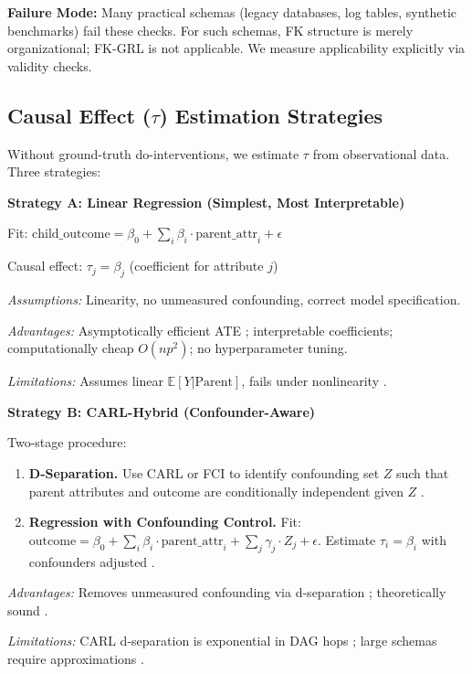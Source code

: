 \documentclass[11pt,letterpaper]{article}
\begin{document}
\textbf{Failure Mode:} Many practical schemas (legacy databases, log tables, synthetic benchmarks) fail these checks. For such schemas, FK structure is merely organizational; FK-GRL is not applicable. We measure applicability explicitly via validity checks.

\subsection{Causal Effect ($\tau$) Estimation Strategies}

Without ground-truth do-interventions, we estimate $\tau$ from observational data. Three strategies:

\textbf{Strategy A: Linear Regression (Simplest, Most Interpretable)}

Fit: $\text{child\_outcome} = \beta_0 + \sum_i \beta_i \cdot \text{parent\_attr}_i + \epsilon$ \cite{Facure2024}

Causal effect: $\tau_j = \beta_j$ (coefficient for attribute $j$) \cite{Facure2024}

\textit{Assumptions:} Linearity, no unmeasured confounding, correct model specification.

\textit{Advantages:} Asymptotically efficient ATE \cite{Facure2024}; interpretable coefficients; computationally cheap $O(np^2)$; no hyperparameter tuning.

\textit{Limitations:} Assumes linear $\mathbb{E}[Y|\text{Parent}]$, fails under nonlinearity \cite{Schoelkopf2020}.

\textbf{Strategy B: CARL-Hybrid (Confounder-Aware)}

Two-stage procedure:

\begin{enumerate}
\item \textbf{D-Separation.} Use CARL \cite{Salimi2020} or FCI to identify confounding set $Z$ such that parent attributes and outcome are conditionally independent given $Z$ \cite{Salimi2020}.
\item \textbf{Regression with Confounding Control.} Fit: $\text{outcome} = \beta_0 + \sum_i \beta_i \cdot \text{parent\_attr}_i + \sum_j \gamma_j \cdot Z_j + \epsilon$. Estimate $\tau_i = \beta_i$ with confounders adjusted \cite{Salimi2020}.
\end{enumerate}

\textit{Advantages:} Removes unmeasured confounding via d-separation \cite{Salimi2020}; theoretically sound \cite{Salimi2020}.

\textit{Limitations:} CARL d-separation is exponential in DAG hops \cite{Negro2025}; large schemas require approximations \cite{Negro2025}.
\end{document}
